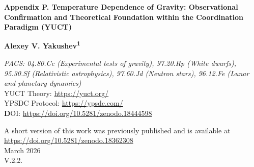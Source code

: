 \documentclass[12pt]{article}
\theoremstyle{remark}
\begin{document}
	
	\begin{titlepage}
		\centering
		\vspace*{0cm}
		
		\Huge\textbf{Appendix P. Temperature Dependence of Gravity: Observational Confirmation and Theoretical Foundation within the Coordination Paradigm (YUCT)}
		
		\vspace{2.3cm}
		
		\Large\textbf{Alexey V. Yakushev\textsuperscript{1}}
		
		\vspace{0.2cm}
		
		\vspace{1.3cm}
		\large\textit{PACS: 04.80.Cc (Experimental tests of gravity), 97.20.Rp (White dwarfs), 95.30.Sf (Relativistic astrophysics), 97.60.Jd (Neutron stars), 96.12.Fe (Lunar and planetary dynamics)} \\
		
		YUCT Theory: \url{https://yuct.org/}\\
		YPSDC Protocol: \url{https://ypsdc.com/}\\
		
		\vspace{2cm}
		\textbf DOI: \url{https://doi.org/10.5281/zenodo.18444598}\\
		
		\vspace{1cm}
		
		\large 
		A short version of this work was previously published and is available at\\ \url{https://doi.org/10.5281/zenodo.18362308}\\
		\vspace{1cm}
		March 2026 \\ \large V.2.2.
		

\end{titlepage}
\end{document}
